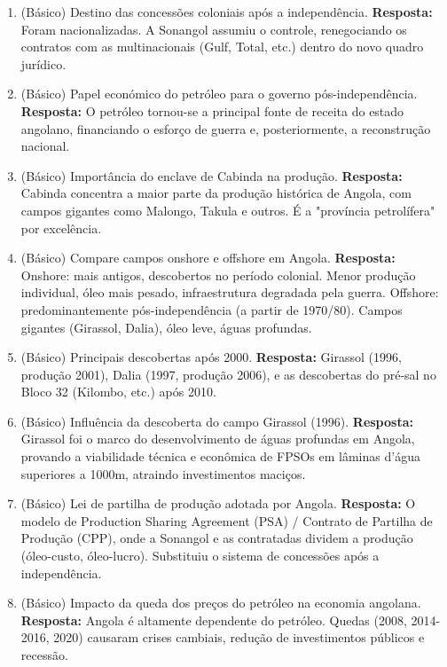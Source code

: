 \documentclass[11pt,a4paper]{article}
\begin{document}
\begin{enumerate}
  \item (Básico) Destino das concessões coloniais após a independência.
  \textbf{Resposta:} Foram nacionalizadas. A Sonangol assumiu o controle, renegociando os contratos com as multinacionais (Gulf, Total, etc.) dentro do novo quadro jurídico.

  \item (Básico) Papel económico do petróleo para o governo pós-independência.
  \textbf{Resposta:} O petróleo tornou-se a principal fonte de receita do estado angolano, financiando o esforço de guerra e, posteriormente, a reconstrução nacional.

  \item (Básico) Importância do enclave de Cabinda na produção.
  \textbf{Resposta:} Cabinda concentra a maior parte da produção histórica de Angola, com campos gigantes como Malongo, Takula e outros. É a "província petrolífera" por excelência.

  \item (Básico) Compare campos onshore e offshore em Angola.
  \textbf{Resposta:} Onshore: mais antigos, descobertos no período colonial. Menor produção individual, óleo mais pesado, infraestrutura degradada pela guerra. Offshore: predominantemente pós-independência (a partir de 1970/80). Campos gigantes (Girassol, Dalia), óleo leve, águas profundas.

  \item (Básico) Principais descobertas após 2000.
  \textbf{Resposta:} Girassol (1996, produção 2001), Dalia (1997, produção 2006), e as descobertas do pré-sal no Bloco 32 (Kilombo, etc.) após 2010.

  \item (Básico) Influência da descoberta do campo Girassol (1996).
  \textbf{Resposta:} Girassol foi o marco do desenvolvimento de águas profundas em Angola, provando a viabilidade técnica e econômica de FPSOs em lâminas d'água superiores a 1000m, atraindo investimentos maciços.

  \item (Básico) Lei de partilha de produção adotada por Angola.
  \textbf{Resposta:} O modelo de Production Sharing Agreement (PSA) / Contrato de Partilha de Produção (CPP), onde a Sonangol e as contratadas dividem a produção (óleo-custo, óleo-lucro). Substituiu o sistema de concessões após a independência.

  \item (Básico) Impacto da queda dos preços do petróleo na economia angolana.
  \textbf{Resposta:} Angola é altamente dependente do petróleo. Quedas (2008, 2014-2016, 2020) causaram crises cambiais, redução de investimentos públicos e recessão.


\end{enumerate}
\end{document}
